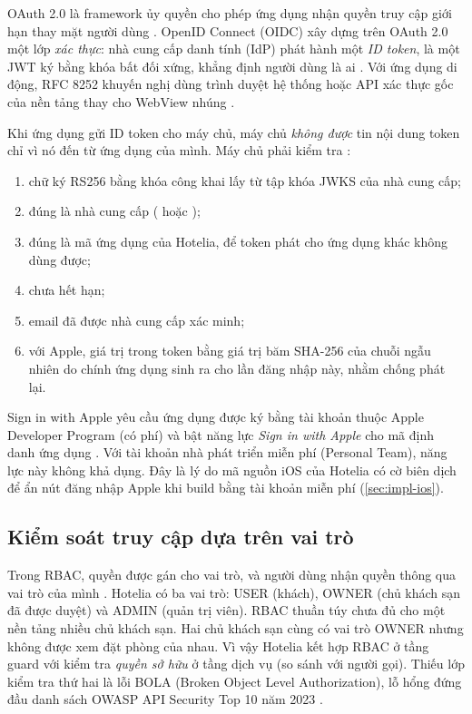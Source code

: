 OAuth 2.0 là framework ủy quyền cho phép ứng dụng nhận quyền truy cập giới hạn thay mặt người dùng \cite{rfc6749}. OpenID Connect (OIDC) xây dựng trên OAuth 2.0 một lớp \emph{xác thực}: nhà cung cấp danh tính (IdP) phát hành một \emph{ID token}, là một JWT ký bằng khóa bất đối xứng, khẳng định người dùng là ai \cite{oidc}. Với ứng dụng di động, RFC 8252 khuyến nghị dùng trình duyệt hệ thống hoặc API xác thực gốc của nền tảng thay cho WebView nhúng \cite{rfc8252}.

Khi ứng dụng gửi ID token cho máy chủ, máy chủ \emph{không được} tin nội dung token chỉ vì nó đến từ ứng dụng của mình. Máy chủ phải kiểm tra \cite{oidc,googleidtoken,applesignin}:
\begin{enumerate}
\item chữ ký RS256 bằng khóa công khai lấy từ tập khóa JWKS của nhà cung cấp;
\item {} đúng là nhà cung cấp ( hoặc );
\item {} đúng là mã ứng dụng của Hotelia, để token phát cho ứng dụng khác không dùng được;
\item {} chưa hết hạn;
\item email đã được nhà cung cấp xác minh;
\item với Apple, giá trị  trong token bằng giá trị băm SHA-256 của chuỗi ngẫu nhiên do chính ứng dụng sinh ra cho lần đăng nhập này, nhằm chống phát lại.
\end{enumerate}
Sign in with Apple yêu cầu ứng dụng được ký bằng tài khoản thuộc Apple Developer Program (có phí) và bật năng lực \emph{Sign in with Apple} cho mã định danh ứng dụng \cite{appleprogram,applesignin}. Với tài khoản nhà phát triển miễn phí (Personal Team), năng lực này không khả dụng. Đây là lý do mã nguồn iOS của Hotelia có cờ biên dịch  để ẩn nút đăng nhập Apple khi build bằng tài khoản miễn phí (\cref{sec:impl-ios}).

\subsection{Kiểm soát truy cập dựa trên vai trò}

Trong RBAC, quyền được gán cho vai trò, và người dùng nhận quyền thông qua vai trò của mình \cite{sandhu1996}. Hotelia có ba vai trò: USER (khách), OWNER (chủ khách sạn đã được duyệt) và ADMIN (quản trị viên). RBAC thuần túy chưa đủ cho một nền tảng nhiều chủ khách sạn. Hai chủ khách sạn cùng có vai trò OWNER nhưng không được xem đặt phòng của nhau. Vì vậy Hotelia kết hợp RBAC ở tầng guard với kiểm tra \emph{quyền sở hữu} ở tầng dịch vụ (so sánh  với người gọi). Thiếu lớp kiểm tra thứ hai là lỗi BOLA (Broken Object Level Authorization), lỗ hổng đứng đầu danh sách OWASP API Security Top 10 năm 2023 \cite{owaspapi}.

